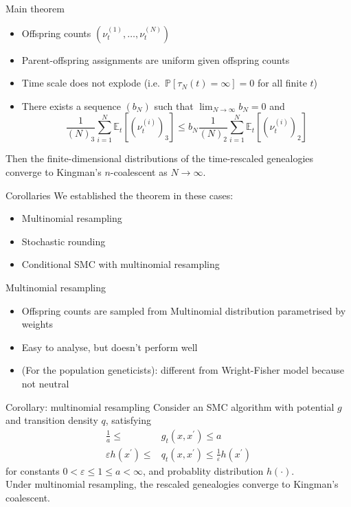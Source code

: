 \documentclass[aspectratio=169]{beamer}
\theoremstyle{definition}
\newcommand{\PR}{\mathbb{P}}
\newcommand{\E}{\mathbb{E}}
\newcommand{\vt}[2][t]{\nu_{#1}^{(#2)}}
\begin{document}
\begin{frame}{Main theorem}
\begin{itemize}
\item Offspring counts $(\vt{1},\dots,\vt{N})$
\pause
\item Parent-offspring assignments are uniform given offspring counts
\item Time scale does not explode (i.e.\ $\PR[\tau_N(t)=\infty]=0$ for all finite $t$)
\item There exists a sequence $(b_N)$ such that $\lim_{N\to\infty} b_N = 0$ and
\begin{equation*}
\frac{1}{(N)_3} \sum_{i=1}^N \E_t [ (\vt{i})_3 ]
\leq b_N \frac{1}{(N)_2} \sum_{i=1}^N \E_t [ (\vt{i})_2 ]
\end{equation*}
\end{itemize}
\pause
Then the finite-dimensional distributions of the time-rescaled genealogies converge to Kingman's $n$-coalescent as $N\to\infty$.
\end{frame}


\begin{frame}{Corollaries}
We established the theorem in these cases:
\begin{itemize}
\item Multinomial resampling
\item Stochastic rounding 
\item Conditional SMC with multinomial resampling
\end{itemize}
\end{frame}


\begin{frame}{Multinomial resampling}
\begin{itemize}
\item Offspring counts are sampled from Multinomial distribution parametrised by weights
\item Easy to analyse, but doesn't perform well
\item (For the population geneticists): different from Wright-Fisher model because not neutral
\end{itemize}
\end{frame}

\begin{frame}{Corollary: multinomial resampling}
Consider an SMC algorithm with potential $g$ and transition density $q$, satisfying
\begin{align*}
\frac{1}{a} \leq &g_t(x, x^\prime) \leq a \\
\varepsilon h(x^\prime) \leq &q_t(x, x^\prime) \leq \frac{1}{\varepsilon} h(x^\prime) 
\end{align*}
for constants $0<\varepsilon\leq 1\leq a<\infty$, and probablity distribution $h(\cdot)$.\\[10pt]

Under multinomial resampling, the rescaled genealogies converge to Kingman's coalescent.
\end{frame}
\end{document}
